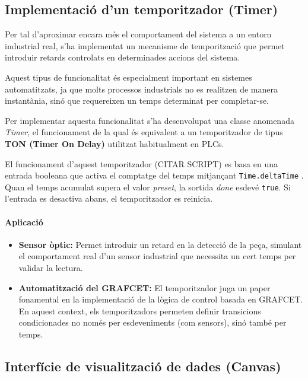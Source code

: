 \documentclass[12pt,a4paper]{report}
\begin{document}
\subsection{Implementació d'un temporitzador (Timer)}
\label{sec:timers}


Per tal d'aproximar encara més el comportament del sistema a un entorn industrial real, s'ha implementat un mecanisme de temporització que permet introduir retards controlats en determinades accions del sistema.

Aquest tipus de funcionalitat és especialment important en sistemes automatitzats, ja que molts processos industrials no es realitzen de manera instantània, sinó que requereixen un temps determinat per completar-se. 

Per implementar aquesta funcionalitat s'ha desenvolupat una classe anomenada \textit{Timer}, el funcionament de la qual és equivalent a un temporitzador de tipus \textbf{TON (Timer On Delay)} utilitzat habitualment en PLCs.

El funcionament d'aquest temporitzador (CITAR SCRIPT) es basa en una entrada booleana que activa el comptatge del temps mitjançant \texttt{Time.deltaTime} \cite{UnityTime}. Quan el temps acumulat supera el valor \textit{preset}, la sortida \textit{done} esdevé \texttt{true}. Si l'entrada es desactiva abans, el temporitzador es reinicia.

\paragraph{Aplicació}

\begin{itemize}

\item \textbf{Sensor òptic:}  
Permet introduir un retard en la detecció de la peça, simulant el comportament real d'un sensor industrial que necessita un cert temps per validar la lectura. 

\item \textbf{Automatització del GRAFCET:}  
El temporitzador juga un paper fonamental en la implementació de la lògica de control basada en GRAFCET. En aquest context, els temporitzadors permeten definir transicions condicionades no només per esdeveniments (com sensors), sinó també per temps. 

\end{itemize}


\subsection{Interfície de visualització de dades (Canvas)}
\end{document}
